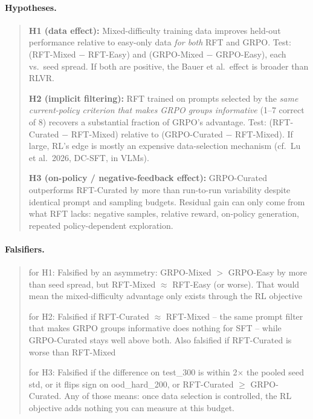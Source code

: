 \documentclass{article}
\begin{document}
\paragraph{Hypotheses.}
\begin{quote}\small
\textbf{H1 (data effect):} Mixed-difficulty training data improves held-out performance relative to easy-only data \emph{for both} RFT and GRPO. Test: (RFT-Mixed $-$ RFT-Easy) and (GRPO-Mixed $-$ GRPO-Easy), each vs.\ seed spread. If both are positive, the Bauer et al.\ effect is broader than RLVR.

\textbf{H2 (implicit filtering):} RFT trained on prompts selected by the \emph{same current-policy criterion that makes GRPO groups informative} (1--7 correct of 8) recovers a substantial fraction of GRPO's advantage. Test: (RFT-Curated $-$ RFT-Mixed) relative to (GRPO-Curated $-$ RFT-Mixed). If large, RL's edge is mostly an expensive data-selection mechanism (cf.\ Lu et al.\ 2026, DC-SFT, in VLMs).

\textbf{H3 (on-policy / negative-feedback effect):} GRPO-Curated outperforms RFT-Curated by more than run-to-run variability despite identical prompt and sampling budgets. Residual gain can only come from what RFT lacks: negative samples, relative reward, on-policy generation, repeated policy-dependent exploration.
\end{quote}

\paragraph{Falsifiers.}

\begin{quote}\small
for H1: Falsified by an asymmetry: GRPO-Mixed $>$ GRPO-Easy by more than seed spread, but RFT-Mixed $\approx$ RFT-Easy (or worse). That would mean the mixed-difficulty advantage only exists through the RL objective

for H2: Falsified if RFT-Curated $\approx$ RFT-Mixed -- the same prompt filter that makes GRPO groups informative does nothing for SFT -- while GRPO-Curated stays well above both. Also falsified if RFT-Curated is worse than RFT-Mixed

for H3: Falsified if the difference on test\_300 is within 2$\times$ the pooled seed std, or it flips sign on ood\_hard\_200, or RFT-Curated $\geq$ GRPO-Curated. Any of those means: once data selection is controlled, the RL objective adds nothing you can measure at this budget.
\end{quote}
\end{document}
